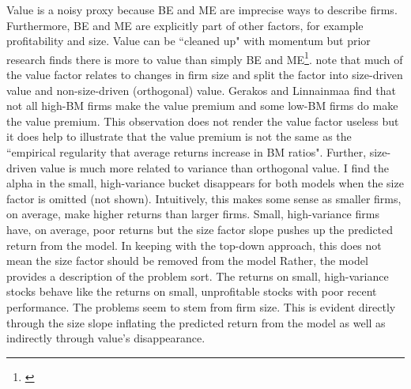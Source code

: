 Value is a noisy proxy because BE and ME are imprecise ways to describe firms.
Furthermore, BE and ME are explicitly part of other factors, for example
profitability and size.
Value can be ``cleaned up" with momentum but prior research finds there is more
to value than simply BE and ME\footnote{
\textcite{cohen2003value, daniel2006market, fama2008average}
}.
\textcite{gerakos2017decomposing} note that much of the value factor relates to
changes in firm size and split the factor into size-driven value and
non-size-driven (orthogonal) value.
Gerakos and Linnainmaa find that not all high-BM firms make the value
premium and some low-BM firms do make the value premium.
This observation does not render the value factor useless but it does help to
illustrate that the value premium is not the same as the ``empirical regularity
that average returns increase in BM ratios".
Further, size-driven value is much more related to variance than orthogonal
value.
I find the alpha in the small, high-variance bucket disappears for both models
when the size factor is omitted (not shown).
Intuitively, this makes some sense as smaller firms, on average, make higher
returns than larger firms.
Small, high-variance firms have, on average, poor returns but the size factor
slope pushes up the predicted return from the model.
In keeping with the top-down approach,
this does not mean the size factor should be removed from the model
Rather, the model provides a description of the problem sort.
The returns on small, high-variance stocks behave like the returns on small,
unprofitable stocks with poor recent performance.
The problems seem to stem from firm size.
This is evident directly through the size slope inflating the predicted return
from the model as well as indirectly through value's disappearance.
